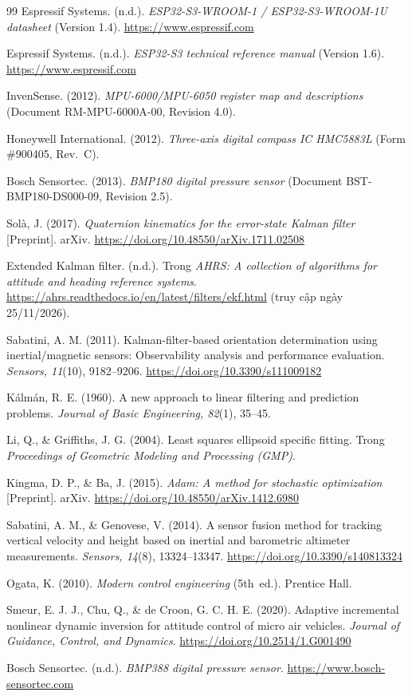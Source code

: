 \begin{thebibliography}{99}
Espressif Systems. (n.d.). \textit{ESP32-S3-WROOM-1 / ESP32-S3-WROOM-1U datasheet} (Version 1.4). \url{https://www.espressif.com}

Espressif Systems. (n.d.). \textit{ESP32-S3 technical reference manual} (Version 1.6). \url{https://www.espressif.com}

InvenSense. (2012). \textit{MPU-6000/MPU-6050 register map and descriptions} (Document RM-MPU-6000A-00, Revision 4.0).

Honeywell International. (2012). \textit{Three-axis digital compass IC HMC5883L} (Form \#900405, Rev.~C).

Bosch Sensortec. (2013). \textit{BMP180 digital pressure sensor} (Document BST-BMP180-DS000-09, Revision 2.5).

Solà, J. (2017). \textit{Quaternion kinematics for the error-state Kalman filter} [Preprint]. arXiv. \url{https://doi.org/10.48550/arXiv.1711.02508}

Extended Kalman filter. (n.d.). Trong \textit{AHRS: A collection of algorithms for attitude and heading reference systems}. \url{https://ahrs.readthedocs.io/en/latest/filters/ekf.html} (truy cập ngày 25/11/2026).

Sabatini, A. M. (2011). Kalman-filter-based orientation determination using inertial/magnetic sensors: Observability analysis and performance evaluation. \textit{Sensors, 11}(10), 9182--9206. \url{https://doi.org/10.3390/s111009182}

Kálmán, R. E. (1960). A new approach to linear filtering and prediction problems. \textit{Journal of Basic Engineering, 82}(1), 35--45.

Li, Q., \& Griffiths, J. G. (2004). Least squares ellipsoid specific fitting. Trong \textit{Proceedings of Geometric Modeling and Processing (GMP)}.

Kingma, D. P., \& Ba, J. (2015). \textit{Adam: A method for stochastic optimization} [Preprint]. arXiv. \url{https://doi.org/10.48550/arXiv.1412.6980}

Sabatini, A. M., \& Genovese, V. (2014). A sensor fusion method for tracking vertical velocity and height based on inertial and barometric altimeter measurements. \textit{Sensors, 14}(8), 13324--13347. \url{https://doi.org/10.3390/s140813324}

Ogata, K. (2010). \textit{Modern control engineering} (5th~ed.). Prentice Hall.

Smeur, E. J. J., Chu, Q., \& de Croon, G. C. H. E. (2020). Adaptive incremental nonlinear dynamic inversion for attitude control of micro air vehicles. \textit{Journal of Guidance, Control, and Dynamics}. \url{https://doi.org/10.2514/1.G001490}

Bosch Sensortec. (n.d.). \textit{BMP388 digital pressure sensor}. \url{https://www.bosch-sensortec.com}

\end{thebibliography}

